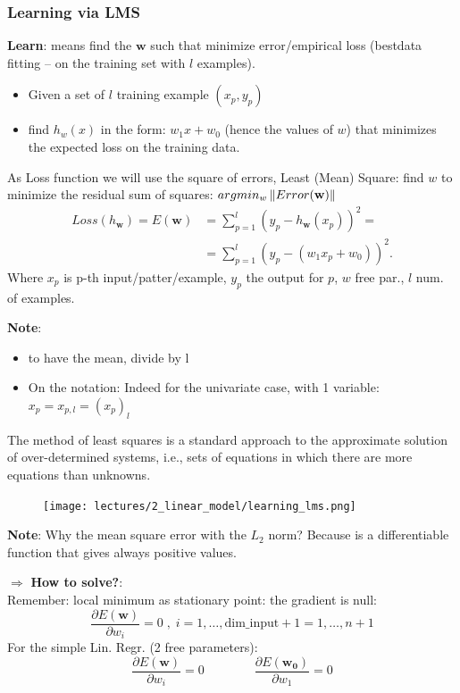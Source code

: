 \documentclass[../main.tex]{subfiles}
\begin{document}
\subsubsection*{Learning via LMS}
\textbf{Learn}: means find the $\textbf{w}$ such that minimize error/empirical loss (bestdata fitting – on the training set with $l$ examples).

\begin{itemize}
    \item Given a set of $l$ training example $(x_p, y_p)$
    \item find $h_w(x)$ in the form: $w_1x + w_0$ (hence the values of $w$) that minimizes the expected loss on the training data.
\end{itemize}

As Loss function we will use the square of errors, Least (Mean) Square: find $w$ to minimize the residual sum of squares: $argmin_w \left\lVert Error(\mathbf{w})\right\rVert$ 
\[\begin{aligned}
    Loss(h_\mathbf{w}) = E(\textbf{w}) &= \sum_{p = 1}^{l} (y_p - h_\mathbf{w}(x_p))^2 =\\
                            &=\sum_{p = 1}^{l} (y_p - (w_1x_p + w_0))^2
.\end{aligned}\]
Where $x_p$ is p-th input/patter/example, $y_p$ the output for $p$, $w$ free par., $l$ num. of examples.

\textbf{Note}: 
\begin{itemize}
    \item to have the mean, divide by l
    \item On the notation: Indeed for the univariate case, with 1 variable: $x_p = x_{p,l} = (x_p)_l$
\end{itemize}
The method of least squares is a standard approach to the approximate solution of over-determined systems, i.e., sets of equations in which there are more equations than unknowns.
\begin{figure}[H]
    \centering
    \texttt{[image: lectures/2\_linear\_model/learning\_lms.png]}
\end{figure}

\textbf{Note}: Why the mean square error with the $L_2$ norm? Because is a differentiable function that gives always positive values.

\noindent $\Rightarrow$ \textbf{How to solve?}:\\
Remember: local minimum as stationary point: the gradient is null:
$$ \frac{\partial E(\mathbf{w})}{\partial{w_i}} = 0 \; , \; i = 1, \dots,  \text{dim\_input}+1 = 1, \dots,  n+1$$
For the simple Lin. Regr. (2 free parameters):
$$ \frac{\partial E(\mathbf{w})}{\partial{w_i}} = 0 \qquad \qquad \frac{\partial E(\mathbf{w_0})}{\partial{w_1}} = 0 $$
\end{document}

